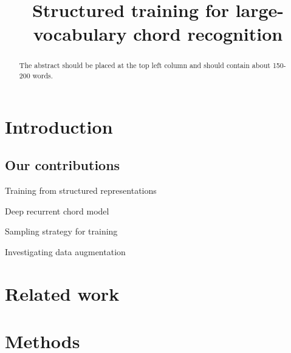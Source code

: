 \documentclass{article}
\title{Structured training for large-vocabulary chord recognition}
\begin{document}
%
\maketitle
%
\begin{abstract}
The abstract should be placed at the top left column and should contain about 150-200 words.
\end{abstract}
%
\section{Introduction}\label{sec:introduction}





\subsection{Our contributions}

Training from structured representations

Deep recurrent chord model

Sampling strategy for training

Investigating data augmentation

%
\section{Related work}





\section{Methods}



\end{document}
